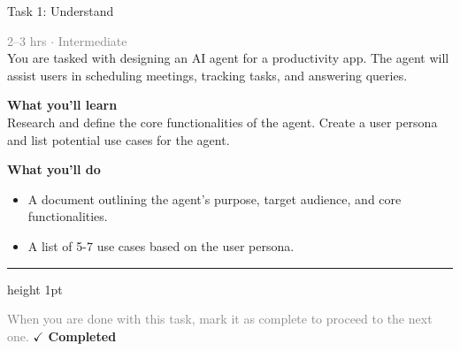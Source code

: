 \documentclass[10pt,a4paper]{article}
\begin{document}
\begin{taskbox}{Task 1: Understand}

    {\small \textcolor{gray}{2--3 hrs $\cdot$ Intermediate}}\\[12pt]

      
You are tasked with designing an AI agent for a productivity app. The agent will assist users in scheduling meetings, tracking tasks, and answering queries.


\vspace{8pt}
{\large \textbf{\textcolor{brandLight}{What you'll learn}}}\\[4pt]  
Research and define the core functionalities of the agent. Create a user persona and list potential use cases for the agent.

\vspace{8pt}
{\large \textbf{\textcolor{brandLight}{What you'll do}}}\\[4pt]  
\begin{itemize}
    \item A document outlining the agent's purpose, target audience, and core functionalities.  
    \item A list of 5-7 use cases based on the user persona.\par
\end{itemize}

    \vspace{16pt}

    \textcolor{cardBorder}{\hrule height 1pt}\vspace{8pt}

    \small \textcolor{gray}{When you are done with this task, mark it as complete to proceed to the next one.} \hfill \textbf{\textcolor{brandDark}{$\checkmark$ Completed}}

\end{taskbox}
\end{document}
